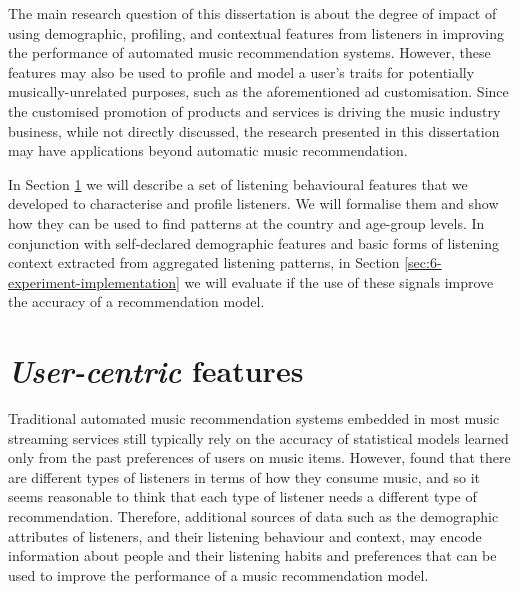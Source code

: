 The main research question of this dissertation is about the degree of impact of using demographic, profiling, and contextual features from listeners in improving the performance of automated music recommendation systems.
However, these features may also be used to profile and model a user's traits for potentially musically-unrelated purposes, such as the aforementioned ad customisation.
Since the customised promotion of products and services is driving the music industry business, while not directly discussed, the research presented in this dissertation may have applications beyond automatic music recommendation.

In Section \ref{sec:6-listener-demographic-profiling-and-contextual-features} we will describe a set of listening behavioural features that we developed to characterise and profile listeners. We will formalise them and show how they can be used to find patterns at the country and age-group levels. In conjunction with self-declared demographic features and basic forms of listening context extracted from  aggregated listening patterns, in Section \ref{sec:6-experiment-implementation} we will evaluate if the use of these signals improve the accuracy of a recommendation model.



\section{\textit{User-centric} features}\label{sec:6-listener-demographic-profiling-and-contextual-features}
Traditional automated music recommendation systems embedded in most music streaming services still typically rely on the accuracy of statistical models learned only from the past preferences of users on music items. 
However, \textcite{lee15user, fuller16elucidating} found that  there are different types of listeners in terms of how they consume music, and so it seems reasonable to think that each type of listener needs a different type of recommendation.
Therefore, additional sources of data such as the demographic attributes of listeners, and their listening behaviour and context, may encode information about people and their listening habits and preferences that can be used to improve the performance of a music recommendation model. 





